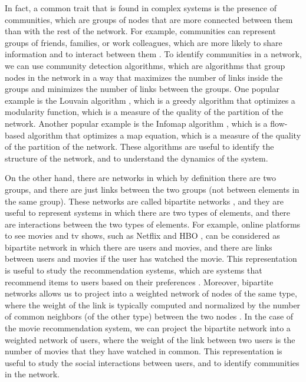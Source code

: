In fact, a common trait that is found in complex systems is the presence of communities, which are groups of nodes that are more connected between them than with the rest of the network. For example, communities can represent groups of friends, families, or work colleagues, which are more likely to share information and to interact between them \cite{newman2001structure}. To identify communities in a network, we can use community detection algorithms, which are algorithms that group nodes in the network in a way that maximizes the number of links inside the groups and minimizes the number of links between the groups. One popular example is the Louvain algorithm \cite{}, which is a greedy algorithm that optimizes a modularity function, which is a measure of the quality of the partition of the network. Another popular example is the Infomap algorithm \cite{}, which is a flow-based algorithm that optimizes a map equation, which is a measure of the quality of the partition of the network. These algorithms are useful to identify the structure of the network, and to understand the dynamics of the system.

On the other hand, there are networks in which by definition there are two groups, and there are just links between the two groups (not between elements in the same group). These networks are called bipartite networks \cite{}, and they are useful to represent systems in which there are two types of elements, and there are interactions between the two types of elements. For example, online platforms to see movies and tv shows, such as Netflix and HBO \cite{}, can be considered as bipartite network in which there are users and movies, and there are links between users and movies if the user has watched the movie. This representation is useful to study the recommendation systems, which are systems that recommend items to users based on their preferences \cite{}. Moreover, bipartite networks allows us to project into a weighted network of nodes of the same type, where the weight of the link is typically computed and normalized by the number of common neighbors (of the other type) between the two nodes \cite{}. In the case of the movie recommendation system, we can project the bipartite network into a weighted network of users, where the weight of the link between two users is the number of movies that they have watched in common. This representation is useful to study the social interactions between users, and to identify communities in the network.

